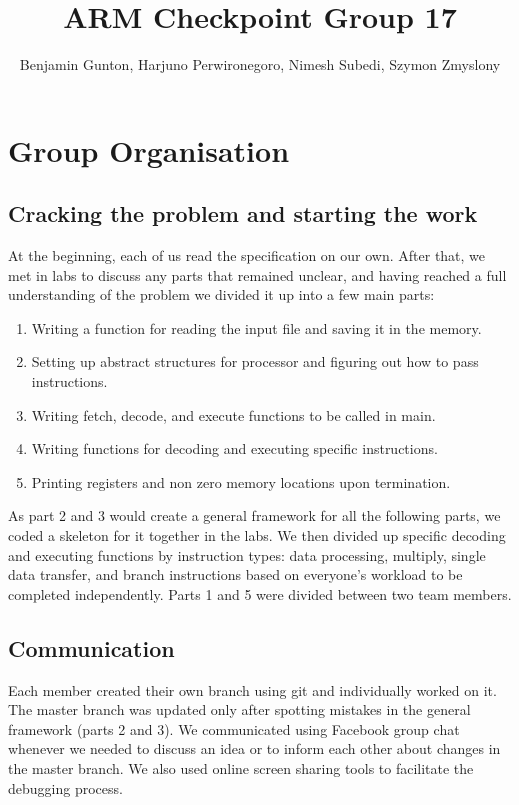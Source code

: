 \documentclass[11pt]{article}
\begin{document}
\title{ARM Checkpoint Group 17 }
\author{Benjamin Gunton, Harjuno Perwironegoro, Nimesh Subedi, Szymon Zmyslony}

\maketitle

\section{Group Organisation}
\subsection{Cracking the problem and starting the work}
At the beginning, each of us read the specification on our own. After that, we met
in labs to discuss any parts that remained unclear, and having reached a full understanding 
of the problem we divided it up into a few main parts:
\begin{enumerate}  
	\item Writing a function for reading the input file and saving it in the memory.
	\item Setting up abstract structures for processor and figuring out how to pass instructions.
	\item Writing fetch, decode, and execute functions to be called in main.
	\item Writing functions for decoding and executing specific instructions.
	\item Printing registers and non zero memory locations upon termination.
\end{enumerate}
As part 2 and 3 would create a general framework for all the following parts, we coded a skeleton for it together in the labs. We then divided up specific decoding and executing functions by instruction types: data processing, multiply, single data transfer, and branch instructions based on everyone's workload to be completed independently. Parts 1 and 5 were divided between two team members.

	\subsection{Communication}
	Each member created their own branch using git and individually worked on it. The master branch was updated only after spotting mistakes in the general framework (parts 2 and 3). We communicated using Facebook group chat whenever we needed to discuss an idea or to inform each other about changes in the master branch.  We also used online screen sharing tools to facilitate the debugging process. 
\end{document}
